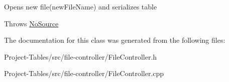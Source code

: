 Opens new file(new\+File\+Name) and serializes table

Throws \hyperlink{structNoSource}{No\+Source} 

The documentation for this class was generated from the following files\+:\begin{DoxyCompactItemize}
\item 
Project-\/\+Tables/src/file-\/controller/File\+Controller.\+h\item 
Project-\/\+Tables/src/file-\/controller/File\+Controller.\+cpp\end{DoxyCompactItemize}
